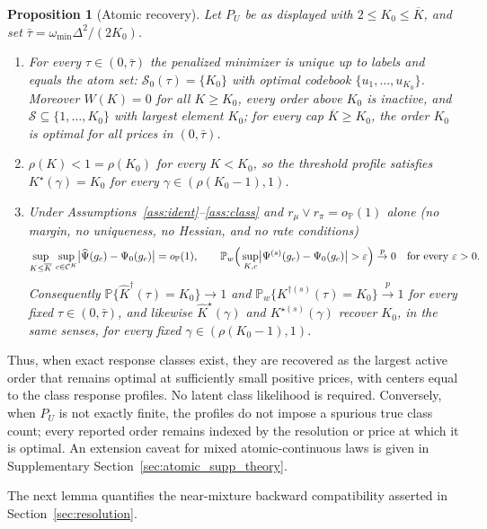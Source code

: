 \documentclass[11pt]{article}
\newtheorem{proposition}{Proposition}
\newcommand{\Pp}{\mathbb P}
\newcommand{\opro}{o_{\Pp}}
\newcommand{\pto}{\overset{p}{\to}}
\newcommand{\calC}{\mathcal C}
\newcommand{\calS}{\mathcal S}
\newcommand{\hPsi}{\widehat\Psi}
\newcommand{\eps}{\varepsilon}
\begin{document}
\begin{proposition}[Atomic recovery]\label{prop:atomic}
Let $P_U$ be as displayed with $2\le K_0\le\overline K$, and set $\bar\tau=\omega_{\min}\Delta^2/(2K_0)$.
\begin{enumerate}[label=(\roman*),leftmargin=2em]
\item For every $\tau\in(0,\bar\tau)$ the penalized minimizer is unique up to labels and equals the atom set: $\calS_0(\tau)=\{K_0\}$ with optimal codebook $\{u_1,\dots,u_{K_0}\}$. Moreover $W(K)=0$ for all $K\ge K_0$, every order above $K_0$ is inactive, and $\calS\subseteq\{1,\dots,K_0\}$ with largest element $K_0$; for every cap $\overline K\ge K_0$, the order $K_0$ is optimal for all prices in $(0,\bar\tau)$.
\item $\rho(K)<1=\rho(K_0)$ for every $K<K_0$, so the threshold profile satisfies $K^\star(\gamma)=K_0$ for every $\gamma\in(\rho(K_0-1),1)$.
\item Under Assumptions~\ref{ass:ident}--\ref{ass:class} and $r_\mu\vee r_\pi=\opro(1)$ alone (no margin, no uniqueness, no Hessian, and no rate conditions)
\begin{equation*}
\sup_{K\le\overline K}\,\sup_{c\in\calC^K}\bigl|\hPsi(g_c)-\Psi_0(g_c)\bigr|=\opro(1),
\qquad
\Pp_w\Bigl(\,\sup_{K,c}\bigl|\Psi^{(s)}(g_c)-\Psi_0(g_c)\bigr|>\eps\Bigr)\pto0\quad\text{for every }\eps>0 .
\end{equation*}
Consequently $\Pp\{\widehat K^\dagger(\tau)=K_0\}\to1$ and $\Pp_w\{K^{\dagger(s)}(\tau)=K_0\}\pto1$ for every fixed $\tau\in(0,\bar\tau)$, and likewise $\widehat K^\star(\gamma)$ and $K^{\star(s)}(\gamma)$ recover $K_0$, in the same senses, for every fixed $\gamma\in(\rho(K_0-1),1)$.
\end{enumerate}
\end{proposition}

Thus, when exact response classes exist, they are recovered as the largest active order that remains optimal at sufficiently small positive prices, with centers equal to the class response profiles.  No latent class likelihood is required.  Conversely, when $P_U$ is not exactly finite, the profiles do not impose a spurious true class count; every reported order remains indexed by the resolution or price at which it is optimal.  An extension caveat for mixed atomic-continuous laws is given in Supplementary Section~\ref{sec:atomic_supp_theory}.

The next lemma quantifies the near-mixture backward compatibility asserted in Section~\ref{sec:resolution}.
\end{document}
